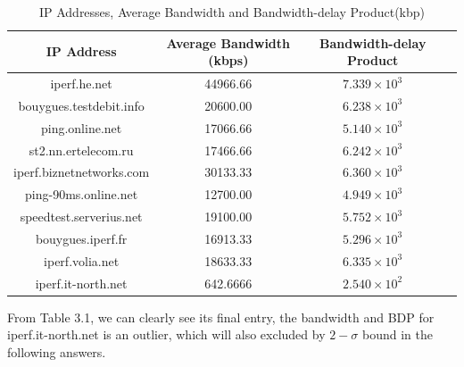 \documentclass[paper=a4, fontsize=10pt]{scrartcl} %
\numberwithin{equation}{section} %
\numberwithin{figure}{section} %
\numberwithin{table}{section} %
\begin{document}
\begin{table}[htbp]
    \centering
    \caption{IP Addresses, Average Bandwidth and Bandwidth-delay Product(kbp)}
    \begin{tabular}{cccc}
    \hline
    IP Address  &Average Bandwidth (kbps) &Bandwidth-delay Product\\
    \hline
    iperf.he.net&44966.66& $7.339\times 10^3 $ \\
    bouygues.testdebit.info  &20600.00& $6.238\times 10^3$ \\
    ping.online.net &17066.66& $5.140\times 10^3$\\
    st2.nn.ertelecom.ru &17466.66&$6.242\times 10^3$ \\
    iperf.biznetnetworks.com &30133.33& $6.360\times 10^3$\\
    ping-90ms.online.net &12700.00& $4.949\times 10^3$\\
    speedtest.serverius.net &19100.00& $5.752\times 10^3$\\
    bouygues.iperf.fr &16913.33& $5.296\times 10^3$\\
    iperf.volia.net &18633.33& $6.335\times 10^3$\\
    iperf.it-north.net &642.6666& $2.540\times 10^2$\\
    \hline
    \end{tabular}
\end{table} 

From Table 3.1, we can clearly see its final entry, the bandwidth and BDP for iperf.it-north.net is an outlier, which will also excluded by $2-\sigma $ bound in the following answers.
\end{document}
